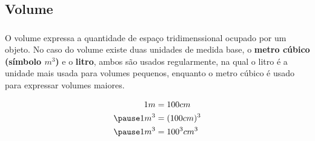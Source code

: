 \documentclass{beamer}
\begin{document}
\begin{frame}\frametitle{\subsecname}

    \begin{table}[H]
    \end{table}
\end{frame}


\subsection{Volume}

\begin{frame}\frametitle{\subsecname}
    O volume expressa
    a quantidade de espaço tridimenssional ocupado por um objeto. No caso do volume existe duas unidades de medida base,
    o \textbf{metro cúbico (símbolo $m^3$)} e o \textbf{litro}, ambos são usados regularmente, na qual o litro é a unidade mais usada para volumes
    pequenos, enquanto o metro cúbico é usado para expressar volumes maiores.

    \begin{align*}
        1m   & = 100cm     \\
        \pause
        1m^3 & = (100cm)^3 \\
        \pause
        1m^3 & = 100^3cm^3
    \end{align*}
\end{frame}
\end{document}
